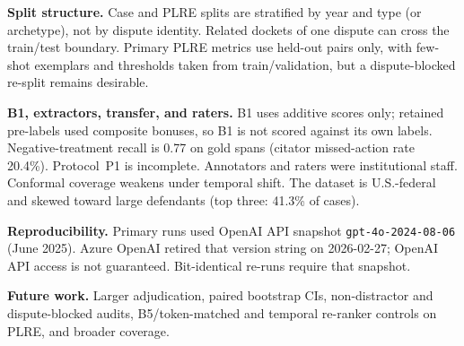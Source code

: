 \textbf{Split structure.}
Case and PLRE splits are stratified by year and type (or archetype), not by dispute identity. Related dockets of one dispute can cross the train/test boundary. Primary PLRE metrics use held-out pairs only, with few-shot exemplars and thresholds taken from train/validation, but a dispute-blocked re-split remains desirable.

\textbf{B1, extractors, transfer, and raters.}
B1 uses additive scores only; retained pre-labels used composite bonuses, so B1 is not scored against its own labels. Negative-treatment recall is 0.77 on gold spans (citator missed-action rate 20.4\%). Protocol~P1 is incomplete. Annotators and raters were institutional staff. Conformal coverage weakens under temporal shift. The dataset is U.S.-federal and skewed toward large defendants (top three: 41.3\% of cases).

\textbf{Reproducibility.}
Primary runs used OpenAI API snapshot \texttt{gpt-4o-2024-08-06} (June 2025). Azure OpenAI retired that version string on 2026-02-27; OpenAI API access is not guaranteed. Bit-identical re-runs require that snapshot.

\textbf{Future work.}
Larger adjudication, paired bootstrap CIs, non-distractor and dispute-blocked audits, B5/token-matched and temporal re-ranker controls on PLRE, and broader coverage.
